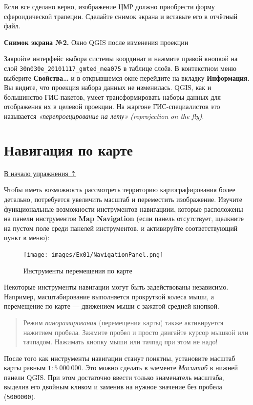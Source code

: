 \documentclass[
  12pt,
]{book}
\begin{document}
Если все сделано верно, изображение ЦМР должно приобрести форму сфероидической трапеции. Сделайте снимок экрана и вставьте его в отчётный файл.

\textbf{Снимок экрана №2.} Окно QGIS после изменения проекции

Закройте интерфейс выбора системы координат и нажмите правой кнопкой на слой \texttt{30n030e\_20101117\_gmted\_mea075} в таблице слоёв. В контекстном меню выберите \textbf{Свойства\ldots{}} и в открывшемся окне перейдите на вкладку \textbf{Информация}. Вы видите, что проекция набора данных не изменилась. QGIS, как и большинство ГИС-пакетов, умеет трансформировать наборы данных для отображения их в целевой проекции. На жаргоне ГИС-специалистов это называется \emph{«перепроецирование на лету» (reprojection on the fly)}.

\hypertarget{map-design-general-navigation}{%
\section{Навигация по карте}\label{map-design-general-navigation}}

\protect\hyperlink{map-design-general}{В начало упражнения ⇡}

Чтобы иметь возможность рассмотреть территорию картографирования более детально, потребуется увеличить масштаб и переместить изображение. Изучите функциональные возможности инструментов навигациии, которые расположены на панели инструментов \textbf{Map Navigation} (если панель отсутствует, щелкните на пустом поле среди панелей инструментов, и активируйте соответствующий пункт в меню):

\begin{figure}
\centering
\texttt{[image: images/Ex01/NavigationPanel.png]}
\caption{Инструменты перемещения по карте}
\end{figure}

Некоторые инструменты навигации могут быть задействованы независимо. Например, масштабирование выполняется прокруткой колеса мыши, а перемещение по карте --- движением мыши с зажатой средней кнопкой.

\begin{quote}
Режим \emph{панорамирования} (перемещения карты) также активируется нажитием пробела. Зажмите пробел и просто двигайте курсор мышкой или тачпадом. Нажимать кнопку мыши или тачпад при этом не надо!
\end{quote}

После того как инструменты навигации станут понятны, установите масштаб карты равным \(1:5~000~000\). Это можно сделать в элементе \emph{Масштаб} в нижней панели QGIS. При этом достаточно ввести только знаменатель масштаба, выделив его двойным кликом и заменив на нужное значение без пробела (\texttt{5000000}).
\end{document}
